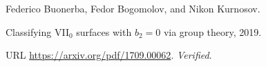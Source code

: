 Federico Buonerba, Fedor Bogomolov, and Nikon Kurnosov.

\newblock Classifying {VII}$_0$ surfaces with $b_2=0$ via group theory, 2019.

\newblock URL \url{https://arxiv.org/pdf/1709.00062}.
\newblock \emph{Verified}.

